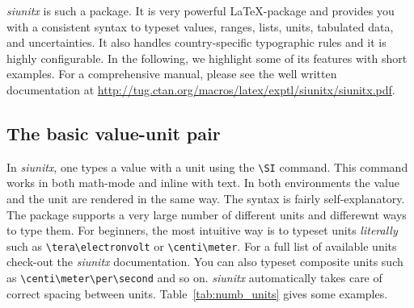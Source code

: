 \documentclass[12pt, a4paper]{scrartcl}
\newcommand{\siunitx}{\textit{siunitx}\xspace}
\begin{document}
\siunitx is such a package. It is very powerful \LaTeX-package and
provides you with a consistent syntax to typeset values, ranges,
lists, units, tabulated data, and uncertainties. It also handles
country-specific typographic rules and it is highly configurable. In
the following, we highlight some of its features with short examples.
For a comprehensive manual, please see the well written documentation
at \url{http://tug.ctan.org/macros/latex/exptl/siunitx/siunitx.pdf}.
%
\subsection{The basic value-unit pair}
In \siunitx, one types a value with a unit using the \verb|\SI|
command. This command works in both math-mode and inline with text. In
both environments the value and the unit are rendered in the same
way. The syntax is fairly self-explanatory. The package supports a
very large number of different units and differewnt ways to type them.
For beginners, the most intuitive way is to typeset units
\emph{literally} such as \verb|\tera\electronvolt| or
\verb|\centi\meter|. For a full list of available units check-out the
\siunitx documentation. You can also typeset composite units such as
\verb|\centi\meter\per\second| and so on. \siunitx automatically takes
care of correct spacing between units. Table~\ref{tab:numb_units}
gives some examples.
%
\end{document}

